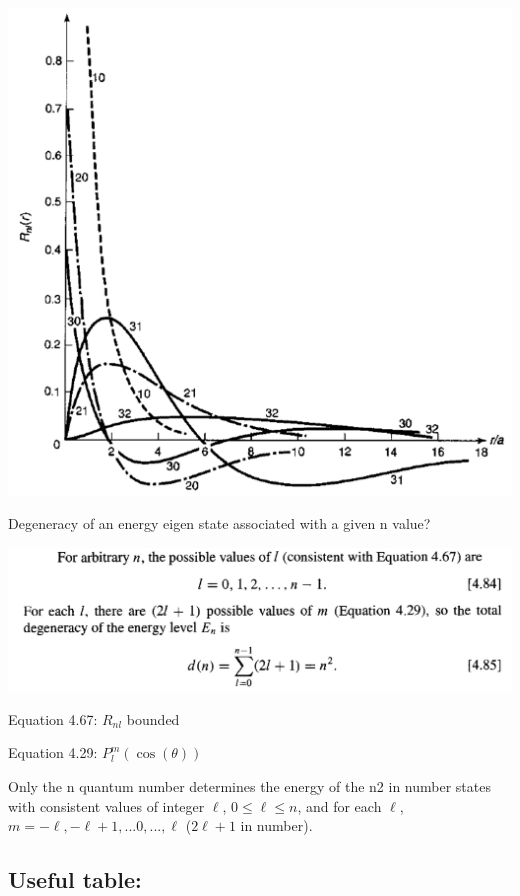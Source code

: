 \documentclass{article}
\begin{document}
    
    \includegraphics[width = 0.7 \textwidth]{Lecture21/3.png}
    
    Degeneracy of an energy eigen state associated with a given n value?

\includegraphics[width = 0.7 \textwidth]{Lecture21/4.png}

Equation 4.67: $R_{nl}$ bounded

Equation 4.29: $P_l^m(\cos(\theta))$

Only the n quantum number determines the energy of the n2 in number states with consistent values of integer $\ell$, $0 \leq \ell \leq n$, and for each $\ell$, $m=-\ell, -\ell+1,...0,...,\ell$ ($2\ell+1$ in number). 

\subsection*{Useful table:}
\end{document}
